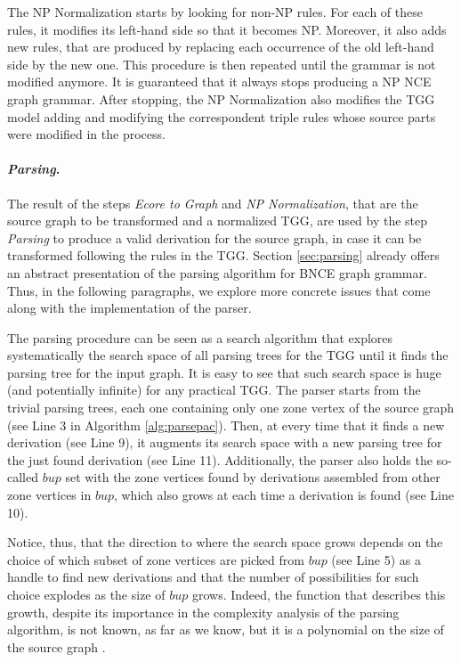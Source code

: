 The NP Normalization starts by looking for non-NP rules. For each of these rules, it modifies its left-hand side so that it becomes NP. Moreover, it also adds new rules, that are produced by replacing each occurrence of the old left-hand side by the new one. This procedure is then repeated until the grammar is not modified anymore. It is guaranteed that it always stops producing a NP NCE graph grammar. After stopping, the NP Normalization also modifies the TGG model adding and modifying the correspondent triple rules whose source parts were modified in the process.


\paragraph*{\emph{Parsing}.} The result of the steps \emph{Ecore to Graph} and \emph{NP Normalization}, that are the source graph to be transformed and a normalized TGG, are used by the step \emph{Parsing} to produce a valid derivation for the source graph, in case it can be transformed following the rules in the TGG. Section \ref{sec:parsing} already offers an abstract presentation of the parsing algorithm for BNCE graph grammar. Thus, in the following paragraphs, we explore more concrete issues that come along with the implementation of the parser.

The parsing procedure can be seen as a search algorithm that explores systematically the search space of all parsing trees for the TGG until it finds the parsing tree for the input graph. It is easy to see that such search space is huge (and potentially infinite) for any practical TGG. The parser starts from the trivial parsing trees, each one containing only one zone vertex of the source graph (see Line 3 in Algorithm \ref{alg:parsepac}). Then, at every time that it finds a new derivation (see Line 9), it augments its search space with a new parsing tree for the just found derivation (see Line 11). Additionally, the parser also holds the so-called $bup$ set with the zone vertices found by derivations assembled from other zone vertices in $bup$, which also grows at each time a derivation is found (see Line 10).

Notice, thus, that the direction to where the search space grows depends on the choice of which subset of zone vertices are picked from $bup$ (see Line 5) as a handle to find new derivations and that the number of possibilities for such choice explodes as the size of $bup$ grows. Indeed, the function that describes this growth, despite its importance in the complexity analysis of the parsing algorithm, is not known, as far as we know, but it is a polynomial on the size of the source graph \cite[p. 160]{rozenberg1986boundary}.

